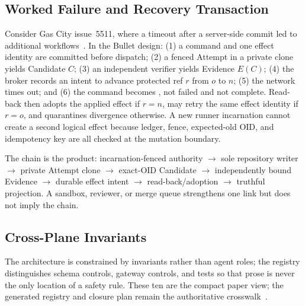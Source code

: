 \documentclass[journal]{IEEEtran}
\newcommand{\code}[1]{\texttt{\detokenize{#1}}}
\begin{document}
\subsection{Worked Failure and Recovery Transaction}

Consider Gas City issue~5511, where a timeout after a server-side commit led
to additional workflows~\cite{gascity5511}. In the Bullet design: (1) a
command and one effect identity are committed before dispatch; (2) a fenced
Attempt in a private clone yields Candidate $C$; (3) an independent verifier
yields Evidence $E(C)$; (4) the broker records an intent to advance protected
ref $r$ from $o$ to $n$; (5) the network times out; and
(6) the command becomes \code{UNKNOWN}, not failed and not complete. Read-back
then adopts the applied effect if $r=n$, may retry the same effect identity if
$r=o$, and quarantines divergence otherwise. A new runner incarnation cannot
create a second logical effect because ledger, fence, expected-old OID, and
idempotency key are all checked at the mutation boundary.

The chain is the product: incarnation-fenced authority $\rightarrow$ sole
repository writer $\rightarrow$ private Attempt clone $\rightarrow$ exact-OID
Candidate $\rightarrow$ independently bound Evidence $\rightarrow$ durable
effect intent $\rightarrow$ read-back/adoption $\rightarrow$ truthful
projection. A sandbox, reviewer, or merge queue strengthens one link but does
not imply the chain.

\subsection{Cross-Plane Invariants}

The architecture is constrained by invariants rather than agent roles; the
registry distinguishes schema controls, gateway controls, and tests so that
prose is never the only location of a safety rule. These ten are the compact
paper view; the generated registry and closure plan remain the authoritative
crosswalk~\cite{bulletRegistry,bulletClosure}.
\end{document}
